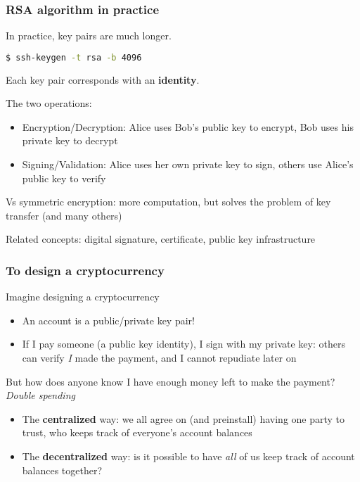 \documentclass{beamer}
\begin{document}
\begin{frame}[fragile]
\frametitle{RSA algorithm in practice}

In practice, key pairs are much longer.
\begin{lstlisting}[language=bash]
  $ ssh-keygen -t rsa -b 4096
\end{lstlisting}

Each key pair corresponds with an \textbf{identity}.

\vspace{0.2in}

The two operations:
\begin{itemize}
  \item {Encryption/Decryption}: Alice uses Bob's public key to encrypt, Bob uses his private key to decrypt
  \item {Signing/Validation}: Alice uses her own private key to sign, others use Alice's public key to verify
\end{itemize}

\vspace{0.2in}
Vs symmetric encryption: more computation, but solves the problem of key transfer (and many others)

\vspace{0.2in}
Related concepts: digital signature, certificate, public key infrastructure

\end{frame}

\begin{frame}
\frametitle{To design a cryptocurrency}

Imagine designing a cryptocurrency
\begin{itemize}
  \item An account is a public/private key pair!
  \item If I pay someone (a public key identity), I sign with my private key: others can verify \textit{I} made the payment, and I cannot repudiate later on
\end{itemize}

But how does anyone know I have enough money left to make the payment? \textit{Double spending}
\begin{itemize}
  \item The \textbf{centralized} way: we all agree on (and preinstall) having one party to trust, who keeps track of everyone's account balances
  \item The \textbf{decentralized} way: is it possible to have \textit{all} of us keep track of account balances together?
\end{itemize}

\end{frame}
\end{document}
